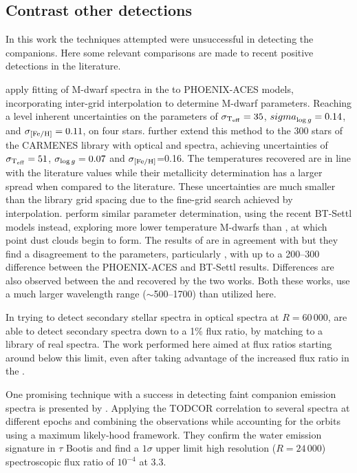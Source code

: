 \subsection{Contrast other detections}

In this work the techniques attempted were unsuccessful in detecting the companions.
Here some relevant comparisons are made to recent positive detections in the literature.

\citet{passegger_fundamental_2016} apply \textchisquared{} fitting of M-dwarf spectra in the \nir{} to {PHOENIX-ACES} models, incorporating inter-grid interpolation to determine M-dwarf parameters.
Reaching a level inherent uncertainties on the parameters of \({\sigma}_{\textrm{T}_{\mathrm{eff}}}= 35\)\K{}, \({sigma}_{\log{g}{}} = 0.14\), and \({\sigma}_{\feh{}}= 0.11\), on four stars.
\citet{passegger_carmenes_2018} further extend this method to the 300 stars of the {CARMENES} library with optical and \nir{} spectra, achieving uncertainties of \({\sigma}_{\textrm{T}_{\mathrm{eff}}{}}=51\)\K{}, \({\sigma}_{\log{g}{}}=0.07\) and \({\sigma}_{\feh{}}\)=0.16.
The temperatures recovered are in line with the literature values while their metallicity determination has a larger spread when compared to the literature.
These uncertainties are much smaller than the library grid spacing due to the fine-grid search achieved by interpolation.
\citet{rajpurohit_exploring_2018} perform similar parameter determination, using the recent {BT-Settl} models instead, exploring more lower temperature M-dwarfs than \citet{passegger_carmens_2018}, at which point dust clouds begin to form.
The results of \citet{rajpurohit_exploring_2018} are in agreement with \citep{gadios_dwarf_2014} but they find a disagreement to the \citet{passegger_carmens_2018} parameters, particularly \Teff{}, with up to a 200--300\K{} difference between the {PHOENIX-ACES} and {BT-Settl} results.
Differences are also observed between the \Logg{} and \feh{} recovered by the two works.
Both these works, use a much larger wavelength range (\(\sim\)500--1700\nm{}) than utilized here.


In trying to detect secondary stellar spectra in optical spectra at \(R=60\,000\), \citep{kolbl_detection_2015} are able to detect secondary spectra down to a 1\% flux ratio, by matching to a library of real spectra.
The work performed here aimed at flux ratios starting around below this limit, even after taking advantage of the increased flux ratio in the \nir{}.


One promising technique with a success in detecting faint companion emission spectra is presented by \citet{lockwood_nearir_2014}.
Applying the {TODCOR} correlation to several spectra at different epochs and combining the observations while accounting for the orbits using a maximum likely-hood framework.
They confirm the water emission signature in {\(\tau\) Bootis} and find a \(1\sigma\) upper limit high resolution (\(R=24\,000\)) spectroscopic flux ratio of \(10^{-4}\) at 3.3\um{}.

